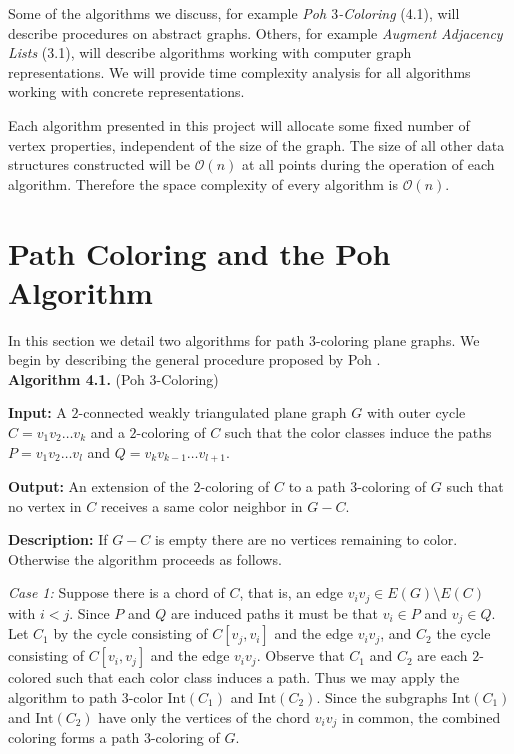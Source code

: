 \documentclass[letterpaper, 12pt]{article}
\theoremstyle{thm}
\begin{document}
Some of the algorithms we discuss, for example \textit{Poh $3$-Coloring} (4.1), will
describe procedures on abstract graphs. Others, for example
\textit{Augment Adjacency Lists} (3.1), will describe algorithms
working with computer graph representations. We will provide time complexity
analysis for all algorithms working with concrete representations.

Each algorithm presented in this project will allocate some fixed number
of vertex properties, independent of the size of the graph. The size of all
other data structures constructed will be $\mathcal{O}(n)$ at all points during
the operation of each algorithm. Therefore the space complexity of every
algorithm is $\mathcal{O}(n)$.


\section{Path Coloring and the Poh Algorithm}

In this section we detail two algorithms for path $3$-coloring plane graphs. We
begin by describing the general procedure proposed by Poh \cite{poh}.\\

\noindent\textbf{Algorithm 4.1.} (Poh $3$-Coloring)

\noindent\textbf{Input:} A $2$-connected weakly triangulated plane graph $G$
with outer cycle $C=v_1v_2\ldots v_k$ and a $2$-coloring of $C$ such that the
color classes induce the paths $P=v_1v_2\ldots v_l$ and
$Q=v_{k}v_{k-1}\ldots v_{l+1}$.

\noindent\textbf{Output:} An extension of the $2$-coloring of $C$ to
a path $3$-coloring of $G$ such that no vertex in $C$ receives a same color
neighbor in $G-C$.

\noindent\textbf{Description:} If $G-C$ is empty there are no vertices remaining
to color. Otherwise the algorithm proceeds as follows.

\textit{Case 1:} Suppose there is a chord of $C$, that is, an edge
$v_iv_j\in E(G)\setminus E(C)$
with $i<j$. Since $P$ and $Q$ are induced paths it must be that $v_i\in P$ and
$v_j\in Q$. Let $C_1$ by the cycle consisting of $C[v_j,v_i]$ and the
edge $v_iv_j$, and $C_2$ the cycle consisting of $C[v_i,v_j]$ and the edge
$v_iv_j$. Observe that $C_1$ and $C_2$ are each $2$-colored
such that each color class induces a path. Thus we may apply the algorithm to
path $3$-color $\text{Int}(C_1)$ and $\text{Int}(C_2)$. Since the subgraphs
$\text{Int}(C_1)$ and $\text{Int}(C_2)$ have only the vertices of the chord
$v_iv_j$ in common, the combined coloring forms a path $3$-coloring of $G$.
\end{document}
